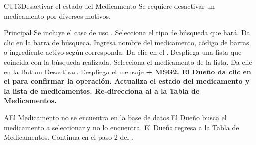 \begin{UseCase}{CU13}{Desactivar el estado del Medicamento}{
		Se requiere desactivar un medicamento por diversos motivos.
	}
	\end{UseCase}
\begin{UCtrayectoria}{Principal}
		\UCpaso Se incluye el caso de uso .
		\UCpaso[\UCactor] Selecciona el tipo de búsqueda que hará.
		\UCpaso[\UCactor] Da clic en la barra de búsqueda.
		\UCpaso [\UCactor] Ingresa nombre del medicamento, código de barras o ingrediente activo según corresponda. 
		\UCpaso[\UCactor] Da clic en el .
		\UCpaso Despliega una lista que coincida con la búsqueda realizada. 
		\UCpaso[\UCactor] Selecciona el medicamento de la lista.
		\UCpaso[\UCactor] Da clic en la  {Botton Desactivar}.
		\UCpaso Despliega el mensaje \bf {+ MSG2}.
		\UCpaso[\UCactor] El Dueño da clic en el  para confirmar la operación.
		\UCpaso Actualiza el estado del medicamento y la lista de medicamentos.
		\UCpaso Re-direcciona al \UCactor a la  {Tabla de Medicamentos}.
	
	\end{UCtrayectoria}


		\begin{UCtrayectoriaA}{A}{El Medicamento no se encuentra en la base de datos}
			\UCpaso[\UCactor] El Dueño busca el medicamento a seleccionar y no lo encuentra.
			\UCpaso[\UCactor] El Dueño regresa a la  {Tabla de Medicamentos}.
			\UCpaso Continua en el paso 2 del .
		\end{UCtrayectoriaA}
		

